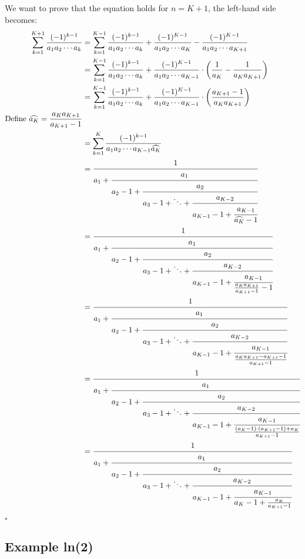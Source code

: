 \documentclass[a4paper]{article}
\begin{document}
\begin{theorem}
        We want to prove that the equation holds for \( n = K+1 \), the left-hand side becomes:
        \begin{align*}
        \sum_{k=1}^{K+1} \frac{(-1)^{k-1}}{a_1 a_2 \cdots a_k} &= \sum_{k=1}^{K-1} \frac{(-1)^{k-1}}{a_1 a_2 \cdots a_k}
        + \frac{(-1)^{K-1}}{a_1 a_2 \cdots a_{K}}
        - \frac{(-1)^{K-1}}{a_1 a_2 \cdots a_{K+1}}
        \\
        &= \sum_{k=1}^{K-1} \frac{(-1)^{k-1}}{a_1 a_2 \cdots a_k}
        + \frac{(-1)^{K-1}}{a_1 a_2 \cdots a_{K-1}} \cdot \left(\frac{1}{a_{K}} -  \frac{1}{a_{K} a_{K+1}} \right)
        \\
        &= \sum_{k=1}^{K-1} \frac{(-1)^{k-1}}{a_1 a_2 \cdots a_k}
        + \frac{(-1)^{K-1}}{a_1 a_2 \cdots a_{K-1}} \cdot \left(\frac{a_{K+1} - 1}{a_{K} a_{K+1}} \right)
        \\
        \text{Define $\widehat{a_{K}} = \frac{a_{K} a_{K+1}}{a_{K+1} - 1}$}
        \\
        &= \sum_{k=1}^{K} \frac{(-1)^{k-1}}{a_1 a_2 \cdots a_{K-1} \widehat{a_{K}}}
        \\
        &= \cfrac{1}{a_1 + \cfrac{a_1}{a_2 - 1 + \cfrac{a_2}{a_3 - 1 + \ddots + \cfrac{a_{K-2}}{a_{K-1} - 1 +
        \cfrac{a_{K-1}}{\widehat{a_K} - 1}}}}}
        \\
        &= \cfrac{1}{a_1 + \cfrac{a_1}{a_2 - 1 + \cfrac{a_2}{a_3 - 1 + \ddots + \cfrac{a_{K-2}}{a_{K-1} - 1 +
        \cfrac{a_{K-1}}{\frac{a_{K} a_{K+1}}{a_{K+1} - 1} - 1}}}}}
        \\
        &= \cfrac{1}{a_1 + \cfrac{a_1}{a_2 - 1 + \cfrac{a_2}{a_3 - 1 + \ddots + \cfrac{a_{K-2}}{a_{K-1} - 1 +
        \cfrac{a_{K-1}}{\frac{a_{K} a_{K+1} - a_{K+1} - 1}{a_{K+1} - 1}}}}}}
        \\
        &= \cfrac{1}{a_1 + \cfrac{a_1}{a_2 - 1 + \cfrac{a_2}{a_3 - 1 + \ddots + \cfrac{a_{K-2}}{a_{K-1} - 1 +
        \cfrac{a_{K-1}}{\frac{(a_{K} - 1) \cdot (a_{K+1} - 1) + a_{K}}{a_{K+1} - 1}}}}}}
        \\
        &= \cfrac{1}{a_1 + \cfrac{a_1}{a_2 - 1 + \cfrac{a_2}{a_3 - 1 + \ddots + \cfrac{a_{K-2}}{a_{K-1} - 1 +
        \cfrac{a_{K-1}}{a_{K} - 1 + \frac{a_{K}}{a_{K+1} - 1}}}}}}
        \end{align*}

        \hfill \(\square\)

    \end{theorem}

    \subsection{Example ln(2)}\label{subsec:example-ln(2)}
\end{document}
